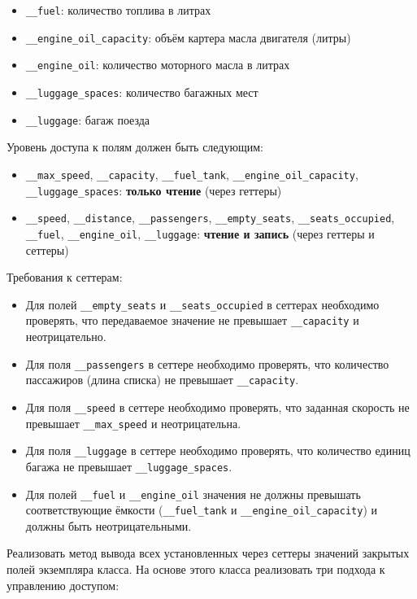 \begin{enumerate}
\begin{itemize}
    \item \texttt{\_\_fuel}: количество топлива в литрах  
    \item \texttt{\_\_engine\_oil\_capacity}: объём картера масла двигателя (литры)  
    \item \texttt{\_\_engine\_oil}: количество моторного масла в литрах  
    \item \texttt{\_\_luggage\_spaces}: количество багажных мест  
    \item \texttt{\_\_luggage}: багаж поезда  
\end{itemize}
Уровень доступа к полям должен быть следующим:
\begin{itemize}
    \item \texttt{\_\_max\_speed}, \texttt{\_\_capacity}, \texttt{\_\_fuel\_tank}, \texttt{\_\_engine\_oil\_capacity}, \texttt{\_\_luggage\_spaces}: \textbf{только чтение} (через геттеры)  
    \item \texttt{\_\_speed}, \texttt{\_\_distance}, \texttt{\_\_passengers}, \texttt{\_\_empty\_seats}, \texttt{\_\_seats\_occupied}, \texttt{\_\_fuel}, \texttt{\_\_engine\_oil}, \texttt{\_\_luggage}: \textbf{чтение и запись} (через геттеры и сеттеры)
\end{itemize}
Требования к сеттерам:
\begin{itemize}
    \item Для полей \texttt{\_\_empty\_seats} и \texttt{\_\_seats\_occupied} в сеттерах необходимо проверять, что передаваемое значение не превышает \texttt{\_\_capacity} и неотрицательно.  
    \item Для поля \texttt{\_\_passengers} в сеттере необходимо проверять, что количество пассажиров (длина списка) не превышает \texttt{\_\_capacity}.  
    \item Для поля \texttt{\_\_speed} в сеттере необходимо проверять, что заданная скорость не превышает \texttt{\_\_max\_speed} и неотрицательна.  
    \item Для поля \texttt{\_\_luggage} в сеттере необходимо проверять, что количество единиц багажа не превышает \texttt{\_\_luggage\_spaces}.
    \item Для полей \texttt{\_\_fuel} и \texttt{\_\_engine\_oil} значения не должны превышать соответствующие ёмкости (\texttt{\_\_fuel\_tank} и \texttt{\_\_engine\_oil\_capacity}) и должны быть неотрицательными.
\end{itemize}
Реализовать метод вывода всех установленных через сеттеры значений закрытых полей экземпляра класса.
На основе этого класса реализовать три подхода к управлению доступом:

\end{enumerate}
